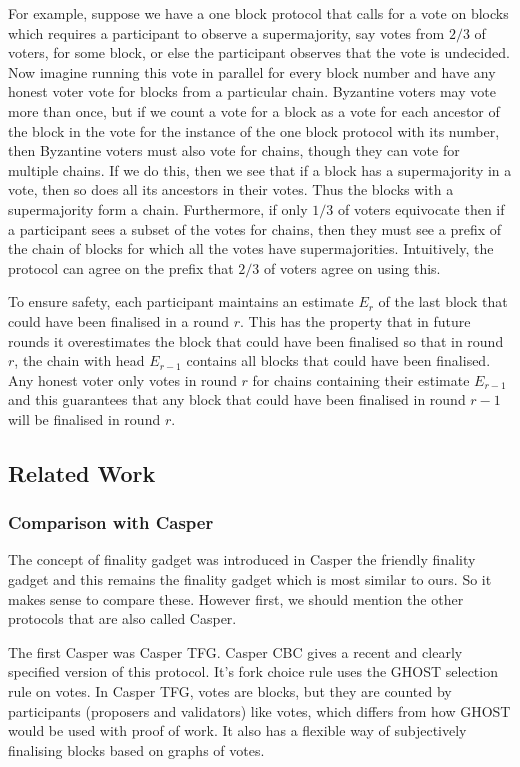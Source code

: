 \documentclass{article}
\begin{document}
For example, suppose we have a one block protocol that calls for a vote on blocks which requires a participant to observe a supermajority, say votes from  $2/3$ of voters, for some block, or else the participant observes that the vote is undecided. Now imagine running this vote in parallel for every block number and have any honest voter vote for blocks from a particular chain.
Byzantine voters may vote more than once, but if we count a vote for a block as a vote for each ancestor of the block in the vote for the instance of the one block protocol with its number, then Byzantine voters must also vote for chains, though they can vote for multiple chains.
If we do this, then we see that if a block has a supermajority in a vote, then so does all its ancestors in their votes. Thus the blocks with a supermajority form a chain.
Furthermore, if only $1/3$ of voters equivocate then if a participant sees a subset of the votes for chains, then they must see a prefix of the chain of blocks for which all the votes have supermajorities. Intuitively, the protocol can agree on the prefix that $2/3$ of voters agree on using this. 

To ensure safety, each participant maintains an estimate $E_r$ of the last block that could have been finalised in a round $r$. This has the property that in future rounds it overestimates the block that could have been finalised so that in round $r$, the chain with head $E_{r-1}$ contains all blocks that could have been finalised.
Any honest voter only votes in round $r$ for chains containing their estimate $E_{r-1}$ and this guarantees that any block that could have been finalised in round $r-1$ will be finalised in round $r$.

\subsection{Related Work}

\subsubsection{Comparison with Casper}

The concept of finality gadget was introduced in Casper the friendly finality gadget and this remains the finality gadget which is most similar to ours. So it makes sense to compare these. However first, we should mention the other protocols that are also called Casper.

The first Casper was Casper TFG. Casper CBC\cite{CasperCBC} gives a recent and clearly specified version of this protocol. It's fork choice rule uses the GHOST selection rule on votes.
In Casper TFG, votes are blocks, but they are counted by participants (proposers and validators) like votes, which differs from how GHOST would be used with proof of work. It also has a flexible way of subjectively finalising blocks based on graphs of votes. 
\end{document}
